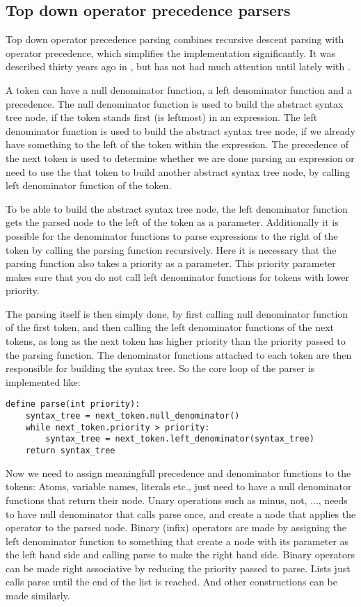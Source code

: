 \documentclass[11pt]{report}
\begin{document}
\subsection{Top down operator precedence parsers}
\label{tdop}
Top down operator precedence parsing combines recursive descent parsing with operator precedence, which simplifies the implementation significantly.
It was described thirty years ago in  \cite{top-down-operator-precedence}, but has not had much attention until lately with  \cite{beautiful-code, crockford-tdop}.

A token can have a null denominator function, a left denominator function and a precedence.
The null denominator function is used to build the abstract syntax tree node, if the token stands first (is leftmost) in an expression.
The left denominator function is used to build the abstract syntax tree node, if we already have something to the left of the token within the expression.
The precedence of the next token is used to determine whether we are done parsing an expression or need to use the that token to build another abstract syntax tree node, by calling left denominator function of the token.

To be able to build the abstract syntax tree node, the left denominator function gets the parsed node to the left of the token as a parameter. Additionally it is possible for the denominator functions to parse expressions to the right of the token by calling the parsing function recursively. Here it is necessary that the parsing function also takes a priority as a parameter. This priority parameter makes sure that you do not call left denominator functions for tokens with lower priority.

The parsing itself is then simply done, by first calling null denominator function of the first token, and then calling the left denominator functions of the next tokens, as long as the next token has higher priority than the priority passed to the parsing function.
The denominator functions attached to each token are then responsible for building the syntax tree.
So the core loop of the parser is implemented like:
\begin{verbatim}
define parse(int priority):
    syntax_tree = next_token.null_denominator()
    while next_token.priority > priority:
        syntax_tree = next_token.left_denominator(syntax_tree)
    return syntax_tree
\end{verbatim}

Now we need to assign meaningfull precedence and denominator functions to the tokens:
Atoms, variable names, literals etc., just need to have a null denominator functions that return their node. Unary operations such as minus, not, ..., needs to have null denominator that calls parse once, and create a node that applies the operator to the parsed node.
Binary (infix) operators are made by assigning the left denominator function to something that create a node with its parameter as the left hand side and calling parse to make the right hand side. Binary operators can be made right associative by reducing the priority passed to parse.
Lists just calls parse until the end of the list is reached. And other constructions can be made similarly. 
\end{document}
